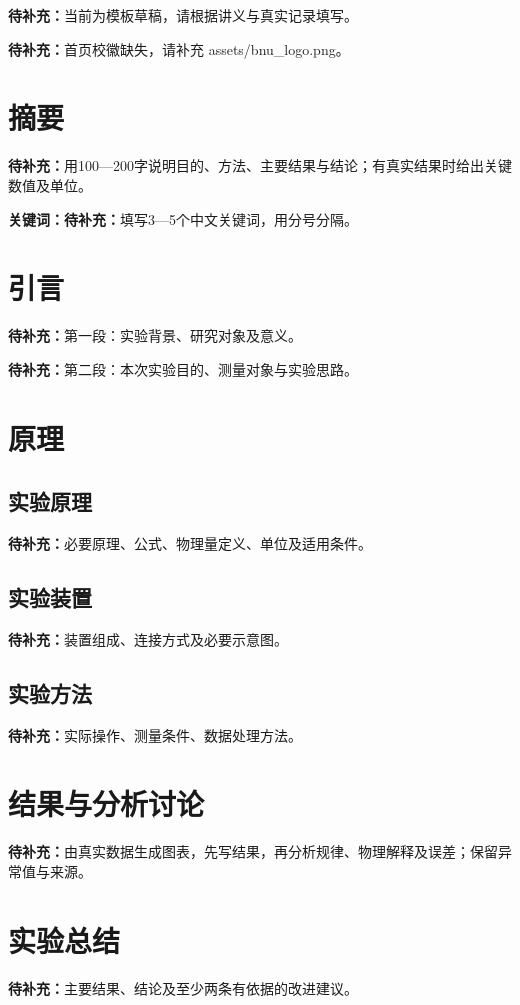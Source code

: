 \documentclass[UTF8,a4paper,11pt,fontset=fandol,scheme=plain]{ctexart}
\title{\ReportTitle}
\author{作者：\ReportBlank{2.4cm}\quad 学号：\ReportBlank{3.0cm}\\
        指导老师：\ReportBlank{2.0cm}\quad 实验时间：\ReportBlank{2.6cm}}
\date{}
\newcommand{\ReportTODO}[1]{\textbf{待补充：}#1}
\newif\ifReportLogo
\begin{document}
\maketitle
\noindent\ReportTODO{当前为模板草稿，请根据讲义与真实记录填写。}
\ifReportLogo\else
  \par\noindent\ReportTODO{首页校徽缺失，请补充 assets/bnu_logo.png。}
\fi

\section*{摘要}
\ReportTODO{用100—200字说明目的、方法、主要结果与结论；有真实结果时给出关键数值及单位。}
\par\noindent\textbf{关键词：}\ReportTODO{填写3—5个中文关键词，用分号分隔。}

\section{引言}\label{sec:introduction}
\ReportTODO{第一段：实验背景、研究对象及意义。}

\ReportTODO{第二段：本次实验目的、测量对象与实验思路。}

\section{原理}\label{sec:principle}
\subsection{实验原理}
\ReportTODO{必要原理、公式、物理量定义、单位及适用条件。}
\subsection{实验装置}
\ReportTODO{装置组成、连接方式及必要示意图。}
\subsection{实验方法}
\ReportTODO{实际操作、测量条件、数据处理方法。}

\section{结果与分析讨论}\label{sec:results}
\ReportTODO{由真实数据生成图表，先写结果，再分析规律、物理解释及误差；保留异常值与来源。}

\section{实验总结}\label{sec:conclusion}
\ReportTODO{主要结果、结论及至少两条有依据的改进建议。}
\end{document}
